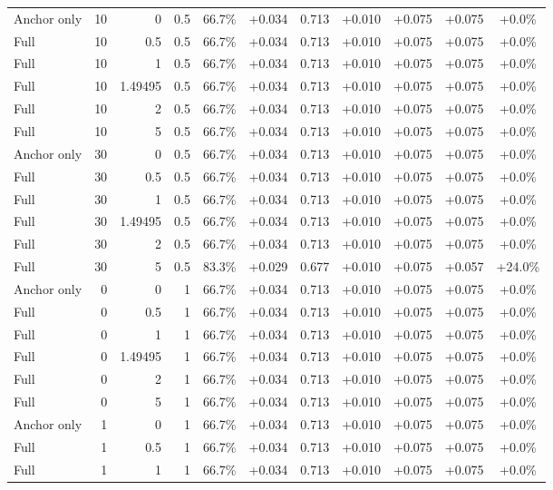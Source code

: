 \begin{table}[htbp]
\begin{tabular}{lrrrccccccc}
Anchor only & 10 & 0 & 0.5 & 66.7\% & +0.034 & 0.713 & +0.010 & +0.075 & +0.075 & +0.0\% \\
Full & 10 & 0.5 & 0.5 & 66.7\% & +0.034 & 0.713 & +0.010 & +0.075 & +0.075 & +0.0\% \\
Full & 10 & 1 & 0.5 & 66.7\% & +0.034 & 0.713 & +0.010 & +0.075 & +0.075 & +0.0\% \\
Full & 10 & 1.49495 & 0.5 & 66.7\% & +0.034 & 0.713 & +0.010 & +0.075 & +0.075 & +0.0\% \\
Full & 10 & 2 & 0.5 & 66.7\% & +0.034 & 0.713 & +0.010 & +0.075 & +0.075 & +0.0\% \\
Full & 10 & 5 & 0.5 & 66.7\% & +0.034 & 0.713 & +0.010 & +0.075 & +0.075 & +0.0\% \\
Anchor only & 30 & 0 & 0.5 & 66.7\% & +0.034 & 0.713 & +0.010 & +0.075 & +0.075 & +0.0\% \\
Full & 30 & 0.5 & 0.5 & 66.7\% & +0.034 & 0.713 & +0.010 & +0.075 & +0.075 & +0.0\% \\
Full & 30 & 1 & 0.5 & 66.7\% & +0.034 & 0.713 & +0.010 & +0.075 & +0.075 & +0.0\% \\
Full & 30 & 1.49495 & 0.5 & 66.7\% & +0.034 & 0.713 & +0.010 & +0.075 & +0.075 & +0.0\% \\
Full & 30 & 2 & 0.5 & 66.7\% & +0.034 & 0.713 & +0.010 & +0.075 & +0.075 & +0.0\% \\
Full & 30 & 5 & 0.5 & 83.3\% & +0.029 & 0.677 & +0.010 & +0.075 & +0.057 & +24.0\% \\
Anchor only & 0 & 0 & 1 & 66.7\% & +0.034 & 0.713 & +0.010 & +0.075 & +0.075 & +0.0\% \\
Full & 0 & 0.5 & 1 & 66.7\% & +0.034 & 0.713 & +0.010 & +0.075 & +0.075 & +0.0\% \\
Full & 0 & 1 & 1 & 66.7\% & +0.034 & 0.713 & +0.010 & +0.075 & +0.075 & +0.0\% \\
Full & 0 & 1.49495 & 1 & 66.7\% & +0.034 & 0.713 & +0.010 & +0.075 & +0.075 & +0.0\% \\
Full & 0 & 2 & 1 & 66.7\% & +0.034 & 0.713 & +0.010 & +0.075 & +0.075 & +0.0\% \\
Full & 0 & 5 & 1 & 66.7\% & +0.034 & 0.713 & +0.010 & +0.075 & +0.075 & +0.0\% \\
Anchor only & 1 & 0 & 1 & 66.7\% & +0.034 & 0.713 & +0.010 & +0.075 & +0.075 & +0.0\% \\
Full & 1 & 0.5 & 1 & 66.7\% & +0.034 & 0.713 & +0.010 & +0.075 & +0.075 & +0.0\% \\
Full & 1 & 1 & 1 & 66.7\% & +0.034 & 0.713 & +0.010 & +0.075 & +0.075 & +0.0\% \\

\end{tabular}
\end{table}

